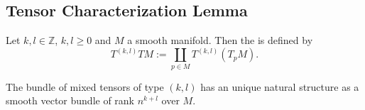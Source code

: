 \begin{appendix}
\section{Tensor Characterization Lemma}
\begin{definition}
Let $k,l \in \mathbb{Z}$, $k,l \geq 0$ and $M$ a smooth manifold. Then the  is defined by
\begin{equation}
T^{(k,l)}TM := \coprod_{p \in M} T^{(k,l)}(T_pM).
\end{equation}
\end{definition}

\begin{proposition}
The bundle of mixed tensors of type $(k,l)$ has an unique natural structure as a smooth vector bundle of rank $n^{k + l}$ over $M$.
\label{prop:smooth_bundle}
\end{proposition}


\end{appendix}

